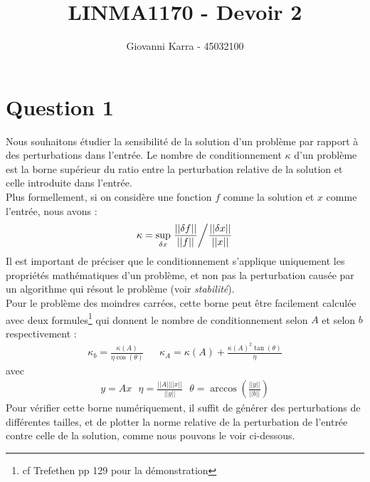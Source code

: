 \documentclass[11pt]{article}
\title{LINMA1170 - Devoir 2}
\author{Giovanni Karra - 45032100}
\begin{document}
\maketitle

\section*{Question 1}
Nous souhaitons étudier la sensibilité de la solution d'un problème par rapport à des perturbations dans l'entrée. Le nombre de conditionnement $\kappa$ d'un problème est la borne supérieur du ratio entre la perturbation relative de la solution et celle introduite dans l'entrée. \\
Plus formellement, si on considère une fonction $f$ comme la solution et $x$ comme l'entrée, nous avons :
\begin{align}
    \kappa = \sup_{\delta x}\left. \frac{||\delta f||}{||f||} \middle/ \frac{||\delta x||}{||x||} \right.
\end{align}
Il est important de préciser que le conditionnement s'applique uniquement les propriétés mathématiques d'un problème, et non pas la perturbation causée par un algorithme qui résout le problème (voir \textit{stabilité}).\\
Pour le problème des moindres carrées, cette borne peut être facilement calculée avec deux formules\footnote{cf Trefethen pp 129 pour la démonstration} qui donnent le nombre de conditionnement selon $A$ et selon $b$ respectivement :
\begin{align}
    \kappa_b = \frac{\kappa(A)}{\eta \cos(\theta)}~~~~~~~\kappa_A = \kappa(A) + \frac{\kappa(A)^2\tan(\theta)}{\eta}
\end{align}
avec
\begin{align}
    y = Ax ~~~ \eta = \frac{||A||||x||}{||y||} ~~~
    \theta = \arccos\left(\frac{||y||}{||b||}\right)
\end{align}
Pour vérifier cette borne numériquement, il suffit de générer des perturbations de différentes tailles, et de plotter la norme relative de la perturbation de l'entrée contre celle de la solution, comme nous pouvons le voir ci-dessous.
\end{document}
